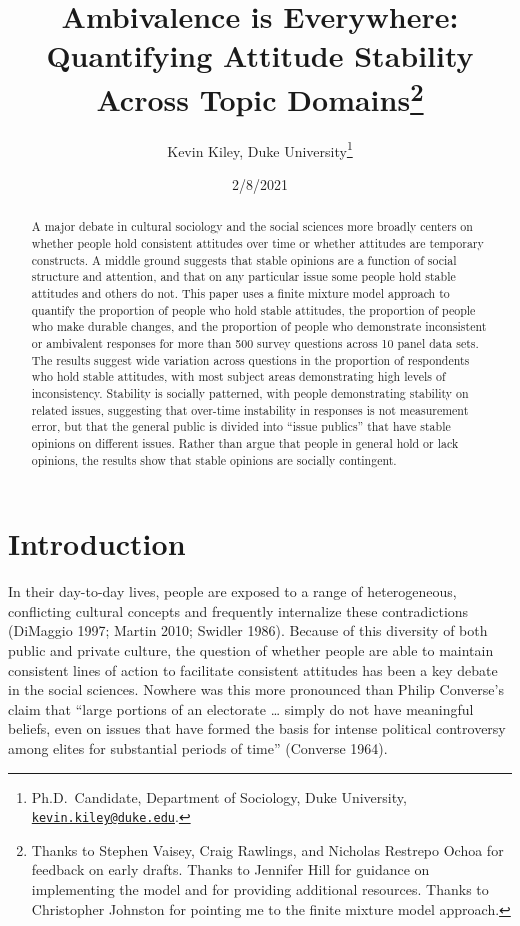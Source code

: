 \documentclass[12pt,]{article}
\title{Ambivalence is Everywhere: Quantifying Attitude Stability Across Topic Domains\footnote{Thanks to Stephen Vaisey, Craig Rawlings, and Nicholas Restrepo Ochoa for feedback on early drafts. Thanks to Jennifer Hill for guidance on implementing the model and for providing additional resources. Thanks to Christopher Johnston for pointing me to the finite mixture model approach.}}
\author{Kevin Kiley, Duke University\footnote{Ph.D.~Candidate, Department of Sociology, Duke University, \href{mailto:kevin.kiley@duke.edu}{\nolinkurl{kevin.kiley@duke.edu}}.}}
\date{2/8/2021}
\begin{document}
\maketitle
\begin{abstract}
A major debate in cultural sociology and the social sciences more broadly centers on whether people hold consistent attitudes over time or whether attitudes are temporary constructs. A middle ground suggests that stable opinions are a function of social structure and attention, and that on any particular issue some people hold stable attitudes and others do not. This paper uses a finite mixture model approach to quantify the proportion of people who hold stable attitudes, the proportion of people who make durable changes, and the proportion of people who demonstrate inconsistent or ambivalent responses for more than 500 survey questions across 10 panel data sets. The results suggest wide variation across questions in the proportion of respondents who hold stable attitudes, with most subject areas demonstrating high levels of inconsistency. Stability is socially patterned, with people demonstrating stability on related issues, suggesting that over-time instability in responses is not measurement error, but that the general public is divided into ``issue publics'' that have stable opinions on different issues. Rather than argue that people in general hold or lack opinions, the results show that stable opinions are socially contingent.
\end{abstract}

\doublespacing

\hypertarget{introduction}{%
\section{Introduction}\label{introduction}}

In their day-to-day lives, people are exposed to a range of heterogeneous, conflicting cultural concepts and frequently internalize these contradictions (DiMaggio 1997; Martin 2010; Swidler 1986). Because of this diversity of both public and private culture, the question of whether people are able to maintain consistent lines of action to facilitate consistent attitudes has been a key debate in the social sciences. Nowhere was this more pronounced than Philip Converse's claim that ``large portions of an electorate \ldots{} simply do not have meaningful beliefs, even on issues that have formed the basis for intense political controversy among elites for substantial periods of time'' (Converse 1964).
\end{document}
